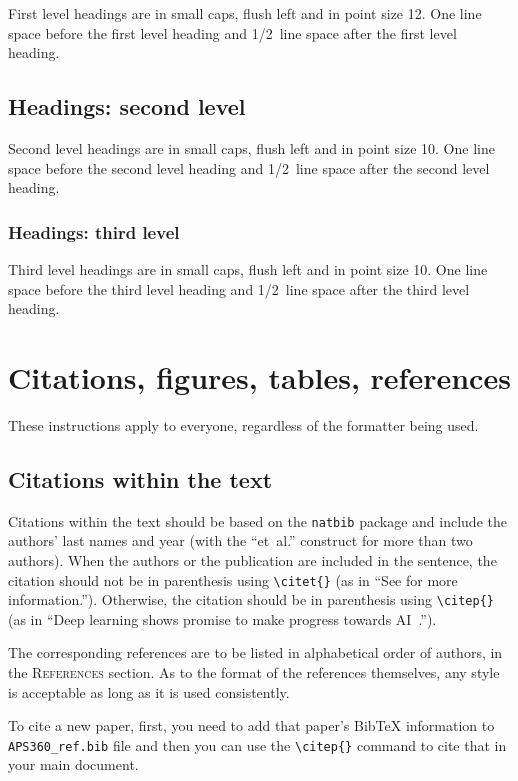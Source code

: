 \documentclass{article} %
\begin{document}
First level headings are in small caps,
flush left and in point size 12. One line space before the first level
heading and 1/2~line space after the first level heading.

\subsection{Headings: second level}

Second level headings are in small caps,
flush left and in point size 10. One line space before the second level
heading and 1/2~line space after the second level heading.

\subsubsection{Headings: third level}

Third level headings are in small caps,
flush left and in point size 10. One line space before the third level
heading and 1/2~line space after the third level heading.

\section{Citations, figures, tables, references}
\label{others}

These instructions apply to everyone, regardless of the formatter being used.

\subsection{Citations within the text}

Citations within the text should be based on the \texttt{natbib} package
and include the authors' last names and year (with the ``et~al.'' construct
for more than two authors). When the authors or the publication are
included in the sentence, the citation should not be in parenthesis using \verb|\citet{}| (as
in ``See \citet{Hinton06} for more information.''). Otherwise, the citation
should be in parenthesis using \verb|\citep{}| (as in ``Deep learning shows promise to make progress
towards AI~\citep{Bengio+chapter2007}.'').

The corresponding references are to be listed in alphabetical order of
authors, in the \textsc{References} section. As to the format of the
references themselves, any style is acceptable as long as it is used
consistently.

To cite a new paper, first, you need to add that paper's BibTeX information to \verb+APS360_ref.bib+ file and then you can use the \verb|\citep{}| command to cite that in your main document. 
\end{document}
